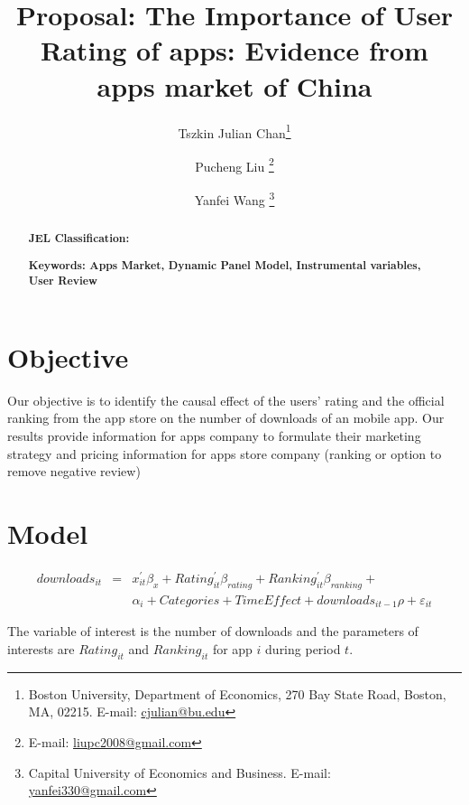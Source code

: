 \documentclass[11pt,twoside]{article}
\title{Proposal: The Importance of User Rating of apps: Evidence from apps market of China }
\author { 
	Tszkin Julian Chan\footnote{Boston University, Department of Economics, 270 Bay State Road, Boston, MA, 02215. E-mail: \protect\url{cjulian@bu.edu}} 
	\and Pucheng Liu \footnote{E-mail:  \protect\url{liupc2008@gmail.com}} 
	\and Yanfei Wang \footnote{ Capital University of Economics and Business. E-mail: \protect\url{yanfei330@gmail.com}} 
}
\begin{document}
\maketitle
\begin{abstract}
\noindent \textbf{JEL Classification: } 

\noindent \textbf{Keywords: Apps Market, Dynamic Panel Model, Instrumental variables, User Review}  

\end{abstract}
\newpage


\section{Objective}
Our objective is to identify the causal effect of the users' rating and the official ranking from the app store on the number of downloads of an mobile app. Our results provide information for apps company to formulate their marketing strategy and pricing information for apps store company (ranking or option to remove negative review)

\section{Model}

\begin{eqnarray} \label{eq:basic_eq}
	downloads_{it} &=& x_{it}^{'} \beta_{x} + Rating_{it}^{'} \beta_{rating} + Ranking_{it}^{'} \beta_{ranking} + \\
	&& \alpha_i + Categories + TimeEffect +  downloads_{it-1} \rho + \varepsilon_{it}
\end{eqnarray}
	
	The variable of interest is the number of downloads and the parameters of interests are $Rating_{it}$ and $Ranking_{it}$ for app $i$ during period $t$. 
\end{document}
